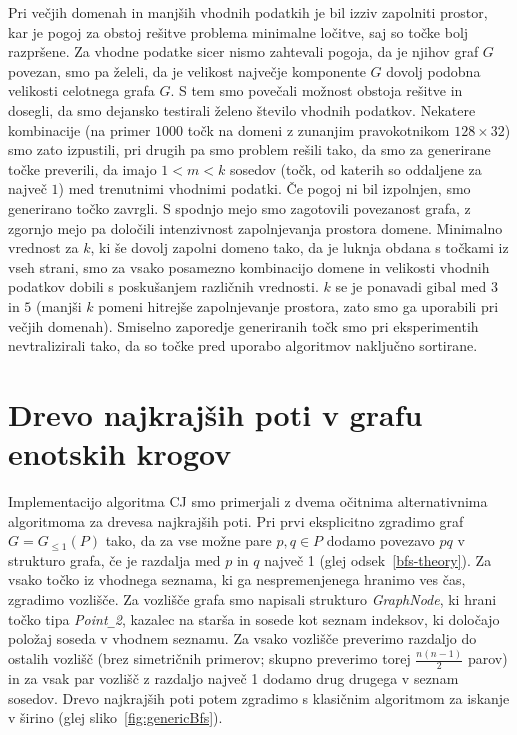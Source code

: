 \documentclass[a4paper, 12pt]{book}
\newcommand{\GG}{\ensuremath{G_{\le 1}}}
\newcommand{\U}{\texttt{\_}}
\begin{document}
Pri večjih domenah in manjših vhodnih podatkih je bil izziv zapolniti prostor, kar je pogoj za obstoj rešitve problema minimalne ločitve, saj so točke bolj razpršene. Za vhodne podatke sicer nismo zahtevali pogoja, da je njihov graf $G$ povezan, smo pa želeli, da je velikost največje komponente $G$ dovolj podobna velikosti celotnega grafa $G$. S tem smo povečali možnost obstoja rešitve in dosegli, da smo dejansko testirali želeno število vhodnih podatkov. Nekatere kombinacije (na primer $1000$ točk na domeni z zunanjim pravokotnikom $128\times 32$) smo zato izpustili, pri drugih pa smo problem rešili tako, da smo za generirane točke preverili, da imajo $1 < m < k$ sosedov (točk, od katerih so oddaljene za največ $1$) med trenutnimi vhodnimi podatki. Če pogoj ni bil izpolnjen, smo generirano točko zavrgli. S spodnjo mejo smo zagotovili povezanost grafa, z zgornjo mejo pa določili intenzivnost zapolnjevanja prostora domene. Minimalno vrednost za $k$, ki še dovolj zapolni domeno tako, da je luknja obdana s točkami iz vseh strani, smo za vsako posamezno kombinacijo domene in velikosti vhodnih podatkov dobili s poskušanjem različnih vrednosti. $k$ se je ponavadi gibal med $3$ in $5$ (manjši $k$ pomeni hitrejše zapolnjevanje prostora, zato smo ga uporabili pri večjih domenah). Smiselno zaporedje generiranih točk smo pri eksperimentih nevtralizirali tako, da so točke pred uporabo algoritmov naključno sortirane.

\section{Drevo najkrajših poti v grafu enotskih krogov}
Implementacijo algoritma CJ smo primerjali z dvema očitnima alternativnima algoritmoma za drevesa najkrajših poti. Pri prvi eksplicitno zgradimo graf $G=\GG(P)$ tako, da za vse možne pare $p, q\in P$ dodamo povezavo $pq$ v strukturo grafa, če je razdalja med $p$ in $q$ največ 1 (glej odsek~\ref{bfs-theory}). Za vsako točko iz vhodnega seznama, ki ga nespremenjenega hranimo ves čas, zgradimo vozlišče. Za vozlišče grafa smo napisali strukturo \textit{GraphNode}, ki hrani točko tipa \textit{Point\U 2}, kazalec na starša in sosede kot seznam indeksov, ki določajo položaj soseda v vhodnem seznamu. Za vsako vozlišče preverimo razdaljo do ostalih vozlišč (brez simetričnih primerov; skupno preverimo torej $\frac{n(n-1)}{2}$ parov) in za vsak par vozlišč z razdaljo največ 1 dodamo drug drugega v seznam sosedov. Drevo najkrajših poti potem zgradimo s klasičnim algoritmom za iskanje v širino (glej sliko~\ref{fig:genericBfs}). 
\end{document}
